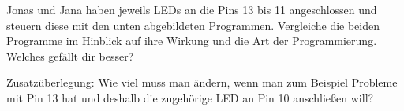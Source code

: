 \documentclass[ngerman, 11pt]{scrreprt}
\begin{document}
	\setcounter{chapter}{4}

	\begin{aufgabe*}
		Jonas und Jana haben jeweils LEDs an die Pins 13 bis 11 angeschlossen und steuern diese mit den unten abgebildeten Programmen. Vergleiche die beiden Programme im Hinblick auf ihre Wirkung und die Art der Programmierung. Welches gefällt dir besser?
		
		Zusatzüberlegung: Wie viel muss man ändern, wenn man zum Beispiel Probleme mit Pin 13 hat und deshalb die zugehörige LED an Pin 10 anschließen will?
	\end{aufgabe*}
	
\end{document}
